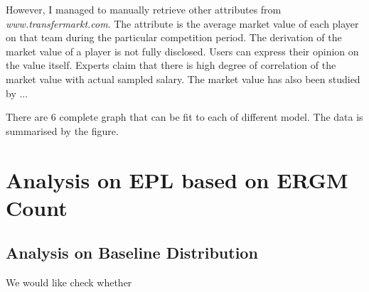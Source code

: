 \documentclass[12pt,a4paper,twoside,openany]{book}\usepackage[]{graphicx}\usepackage[]{color}
\begin{document}
However, I managed to manually retrieve other attributes from \textit{www.transfermarkt.com}.
The attribute is the average market value of each player on that team during the particular competition period. 
The derivation of the market value of a player is not fully disclosed.
Users can express their opinion on the value itself.
Experts claim that there is high degree of correlation of the market value with actual sampled salary.
The market value has also been studied by ...

There are 6 complete graph that can be fit to each of different model. The data is summarised by the figure.

\section{Analysis on EPL based on ERGM Count}
\subsection{Analysis on Baseline Distribution}
We would like check whether 




{}



\end{document}

